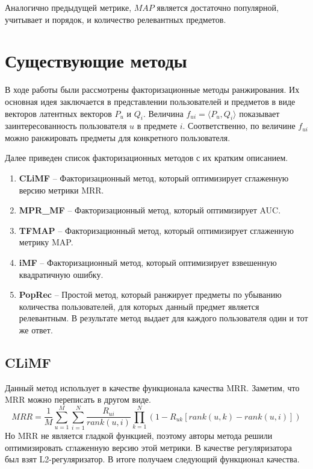 \documentclass[a4paper,12pt]{article}
\begin{document}
	Аналогично предыдущей метрике, $MAP$ является достаточно популярной, учитывает и порядок, и количество релевантных предметов.
	
	

\section{Существующие методы}
В ходе работы были рассмотрены факторизационные методы ранжирования. Их основная идея заключается в представлении пользователей и предметов в виде векторов латентных векторов $P_u$ и $Q_i$. Величина $f_{ui} = \langle P_u, Q_i\rangle$  показывает заинтересованность пользователя $u$ в предмете  $i$. Соответственно, по величине $f_{ui}$ можно ранжировать предметы для конкретного пользователя.
	
Далее приведен список факторизационных методов с их кратким описанием.  
\begin{enumerate}
\item \textbf{CLiMF} --
  Факторизационный метод, который оптимизирует сглаженную версию метрики MRR.\cite{climf}
  	
\item \textbf{MPR\_MF} -- 
  Факторизационный метод, который оптимизирует AUC.\cite{bprmp}
  
\item \textbf{TFMAP} --
   Факторизационный метод, который оптимизирует сглаженную метрику MAP.\cite{tfmap}

\item \textbf{iMF} --
	Факторизационный метод, который оптимизирует взвешенную квадратичную ошибку.\cite{imf} 

\item \textbf{PopRec} --
    Простой метод, который ранжирует предметы по убыванию количества пользователей, для которых данный предмет является релевантным. В результате метод выдает для каждого пользователя один  и тот же ответ.
\end{enumerate}

\subsection{CLiMF}
Данный метод использует в качестве функционала качества MRR. Заметим, что MRR можно переписать в другом виде.
\begin{equation*}
 MRR =\frac{1}{M}\sum_{u=1}^M \sum_{i=1}^N \frac{R_{ui}}{rank(u,i)}\prod_{k=1}^N(1 - R_{uk}[rank(u,k) - rank(u, i)])
\end{equation*}
 Но  MRR не является гладкой функцией, поэтому авторы метода решили оптимизировать сглаженную версию этой метрики. В качестве регуляризатора был взят L2-регуляризатор. В итоге получаем следующий функционал качества.
\end{document}
